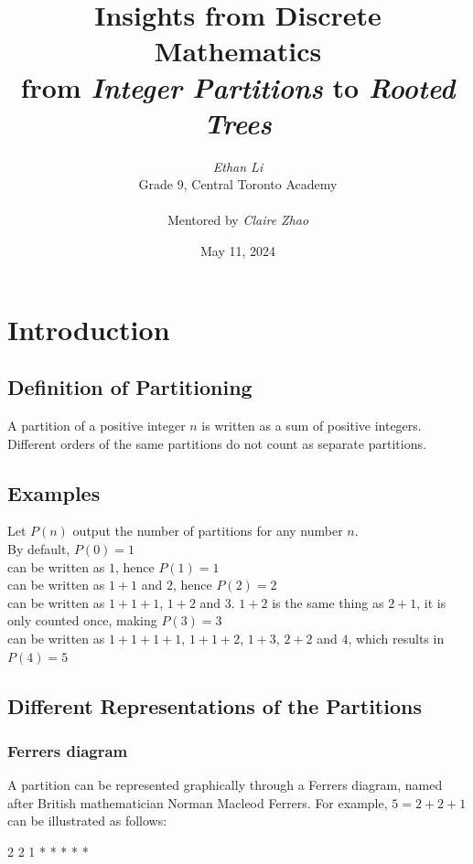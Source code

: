 \documentclass{article}
\title{\vspace{-2.0cm}\textbf{Insights from Discrete Mathematics \\
\LARGE from \emph{Integer Partitions} to \emph{Rooted Trees}}}
\author{\textit{Ethan Li} \\ \small Grade 9, Central Toronto Academy \\ \\ \small Mentored by \normalsize \textit{Claire Zhao}}
\date{May 11, 2024}
\theoremstyle{definition}
\theoremstyle{question}
\begin{document}
\maketitle

\section{Introduction}

\subsection{Definition of Partitioning}
A partition of a positive integer \(n\) is written as a sum of positive integers. Different orders of the same partitions do not count as separate partitions.

\subsection{Examples}
Let \(P(n)\) output the number of partitions for any number \(n\).\\

\noindent By default, \(P(0)=1\)\\

 can be written as \(1\), hence \(P(1)=1\)\\

 can be written as \(1+1\) and \(2\), hence \(P(2)=2\)\\

 can be written as \(1+1+1\), \(1+2\) and \(3\). \(1+2\) is the same thing as \(2+1\), it is only counted once, making \(P(3) = 3\)\\

 can be written as \(1+1+1+1\), \(1+1+2\), \(1+3\), \(2+2\) and \(4\), which results in \(P(4)=5\)

\subsection{Different Representations of the Partitions}
\subsubsection{Ferrers diagram}

A partition can be represented graphically through a Ferrers diagram, named after British mathematician Norman Macleod Ferrers. For example, \(5=2+2+1\) can be illustrated as follows:\\
\begin{center}
\begin{verbbox}
2 2 1
* * *
* *
\\
\end{verbbox}
\theverbbox
\end{center}
\end{document}
